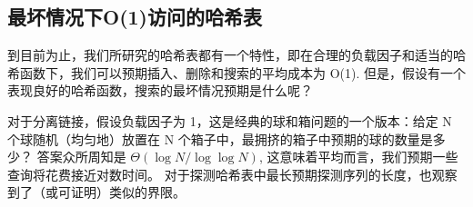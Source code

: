\documentclass[a4paper]{ctexart}
\theoremstyle{definition}
\theoremstyle{definition}
\begin{document}





\subsection{最坏情况下O(1)访问的哈希表}

到目前为止，我们所研究的哈希表都有一个特性，即在合理的负载因子和适当的哈希函数下，我们可以预期插入、删除和搜索的平均成本为 O(1). 
但是，假设有一个表现良好的哈希函数，搜索的最坏情况预期是什么呢？

对于分离链接，假设负载因子为 1，这是经典的球和箱问题的一个版本：给定 N 个球随机（均匀地）放置在 N 个箱子中，最拥挤的箱子中预期的球的数量是多少？
答案众所周知是 $\Theta(\log N / \log \log N)$, 这意味着平均而言，我们预期一些查询将花费接近对数时间。
对于探测哈希表中最长预期探测序列的长度，也观察到了（或可证明）类似的界限。
\end{document}
